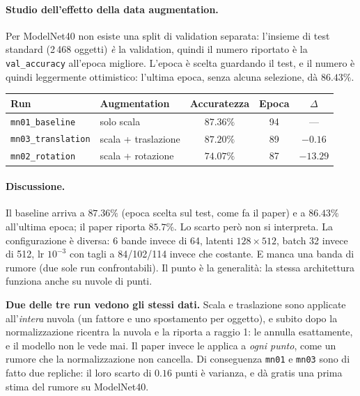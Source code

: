 \documentclass[
  11pt,
]{article}
\begin{document}
\paragraph{Studio dell'effetto della data augmentation.}
Per ModelNet40 non esiste una split di validation separata: l'insieme di test standard (2\,468 oggetti) \emph{è} la validation, quindi il numero riportato è la \texttt{val\_accuracy} all'epoca migliore. L'epoca è scelta guardando il test, e il numero è quindi leggermente ottimistico: l'ultima epoca, senza alcuna selezione, dà $86.43\%$.

\begin{center}
{\small
\begin{tabular}{@{}llccc@{}}
\toprule
\textbf{Run} & \textbf{Augmentation} & \textbf{Accuratezza} & \textbf{Epoca} & \textbf{$\Delta$} \\
\midrule
\texttt{mn01\_baseline} & solo scala & $\mathbf{87.36\%}$ & 94 & --- \\[2pt]
\texttt{mn03\_translation} & scala + traslazione & $87.20\%$ & 89 & $-0.16$ \\[2pt]
\texttt{mn02\_rotation} & scala + rotazione & $74.07\%$ & 87 & $\mathbf{-13.29}$ \\
\bottomrule
\end{tabular}
}
\end{center}

\paragraph{Discussione.} Il baseline arriva a $87.36\%$ (epoca scelta sul test, come fa il paper) e a $86.43\%$ all'ultima epoca; il paper riporta $85.7\%$. Lo scarto però non si interpreta. La configurazione è diversa: 6 bande invece di 64, latenti $128 \times 512$, batch 32 invece di 512, lr $10^{-3}$ con tagli a 84/102/114 invece che costante. E manca una banda di rumore (due sole run confrontabili). Il punto è la generalità: la stessa architettura funziona anche su nuvole di punti.

\textbf{Due delle tre run vedono gli stessi dati.} Scala e traslazione sono applicate all'\emph{intera} nuvola (un fattore e uno spostamento per oggetto), e subito dopo la normalizzazione ricentra la nuvola e la riporta a raggio 1: le annulla esattamente, e il modello non le vede mai. Il paper invece le applica a \emph{ogni punto}, come un rumore che la normalizzazione non cancella. Di conseguenza \texttt{mn01} e \texttt{mn03} sono di fatto due repliche: il loro scarto di $0.16$ punti è varianza, e dà gratis una prima stima del rumore su ModelNet40.
\end{document}

